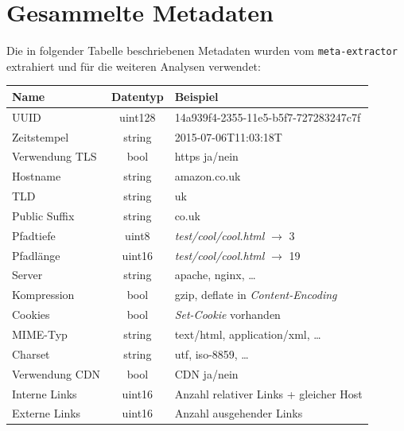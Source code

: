 \documentclass[a4paper,12pt,titlepage=false]{scrreprt}
\begin{document}
\section{Gesammelte Metadaten}
\label{csv-data}

Die in folgender Tabelle beschriebenen Metadaten wurden vom \texttt{meta-extractor}
extrahiert und für die weiteren Analysen verwendet:

\begin{center}
\begin{tabular}{lcl}
    \textbf{Name}  & \textbf{Datentyp} & \textbf{Beispiel} \\ \hline\hline
    UUID           & uint128           & \textcolor{light-gray}{14a939f4-2355-11e5-b5f7-727283247c7f} \\ \hline
    Zeitstempel    & string            & \textcolor{light-gray}{2015-07-06T11:03:18T} \\ \hline
    Verwendung TLS & bool              & https ja/nein \\ \hline
    Hostname       & string            & \textcolor{light-gray}{amazon.co.uk} \\ \hline
    TLD            & string            & \textcolor{light-gray}{uk} \\ \hline
    Public Suffix  & string            & \textcolor{light-gray}{co.uk} \\ \hline
    Pfadtiefe      & uint8             & \textit{test/cool/cool.html} $\rightarrow$ \textcolor{light-gray}{3} \\ \hline
    Pfadlänge      & uint16            & \textit{test/cool/cool.html} $\rightarrow$ \textcolor{light-gray}{19} \\ \hline
    Server         & string            & \textcolor{light-gray}{apache}, \textcolor{light-gray}{nginx}, \dots \\ \hline
    Kompression    & bool              & \textcolor{light-gray}{gzip}, \textcolor{light-gray}{deflate} in \textit{Content-Encoding} \\ \hline
    Cookies        & bool              & \textit{Set-Cookie} vorhanden \\ \hline
    MIME-Typ       & string            & \textcolor{light-gray}{text/html}, \textcolor{light-gray}{application/xml}, \dots\\ \hline
    Charset        & string            & \textcolor{light-gray}{utf}, \textcolor{light-gray}{iso-8859}, \dots \\ \hline
    Verwendung CDN & bool              & CDN ja/nein \\ \hline
    Interne Links  & uint16            & Anzahl relativer Links + gleicher Host \\ \hline
    Externe Links  & uint16            & Anzahl ausgehender Links
\end{tabular}
\end{center}
\end{document}
